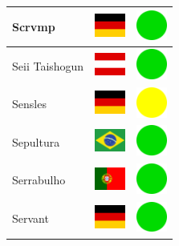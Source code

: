 \documentclass[12pt, a4paper, twoside]{report}
\begin{document}
\begin{center}
\begin{longtable}{|p{5cm}|p{2cm}|p{2cm}|}
Scrvmp & \includegraphics[width=1cm]{4x3/de} & \includegraphics[width=1cm]{likes/y} \\ \hline
Seii Taishogun & \includegraphics[width=1cm]{4x3/at} & \includegraphics[width=1cm]{likes/y} \\ \hline
Sensles & \includegraphics[width=1cm]{4x3/de} & \includegraphics[width=1cm]{likes/m} \\ \hline
Sepultura & \includegraphics[width=1cm]{4x3/br} & \includegraphics[width=1cm]{likes/y} \\ \hline
Serrabulho & \includegraphics[width=1cm]{4x3/pt} & \includegraphics[width=1cm]{likes/y} \\ \hline
Servant & \includegraphics[width=1cm]{4x3/de} & \includegraphics[width=1cm]{likes/y} \\ \hline

\end{longtable}
\end{center}
\end{document}
